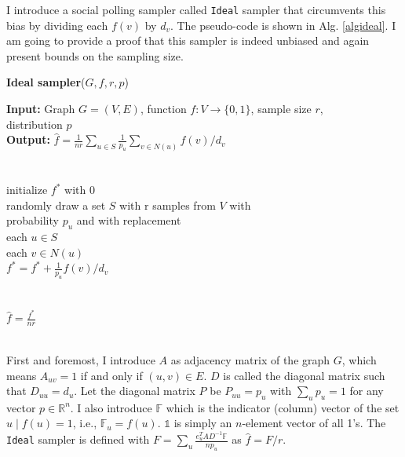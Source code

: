 I introduce a social polling sampler called \texttt{Ideal} sampler that circumvents this bias by dividing each $f(v)$ by $d_v$. The pseudo-code is shown in Alg. \ref{algideal}.
I am going to provide a proof that this sampler is indeed unbiased and again present bounds on the sampling size.
\begin{algorithm*}[!htb]
\caption{\small {\bf Ideal sampler}($G, f, r, p$)}
\begin{code}
{\bf Input:} Graph $G=(V,E)$, function $f : V \rightarrow \{0,1\}$, sample size $r$,\\ distribution $p$ \\
{\bf Output:} $\hat{f}=\frac{1}{nr}\sum\nolimits_{u\in S}\frac{1}{p_u}\sum\nolimits_{v\in N(u)} f(v)/d_v$\\
\\
\uln \>\ubegin\\
\uln \>\>initialize $f^*$ with 0 \\
\uln \>\>randomly draw a set $S$ with r samples from $V$ with\\
\>   \>\>\>probability $p_u$ and with replacement\\
\uln \>\>\ufor each $u \in S$ \udo\\
\uln \>\>\>\ufor each $v \in N(u)$ \udo\\
\uln \>\>\>\>$f^* = f^* + \frac{1}{p_u}f(v)/d_v$ \\
\uln \>\>\>\uend\\
\uln \>\>\uend\\
\uln \>\ureturn $\hat{f} = \frac{f^*}{nr}$ \\
\uln \>\uend\\ 
\end{code}
\label{algideal}
\end{algorithm*}

First and foremost, I introduce $A$ as adjacency matrix of the graph $G$, which means $A_{uv} = 1$ if and only if $(u,v) \in E$. $D$ is called the diagonal matrix such that $D_{uu} = d_u$.
Let the diagonal matrix $P$ be $P_{uu} = p_u$ with $\sum\nolimits_{u}p_u = 1$ for any vector $p \in \mathbb{R}^n$.
I also introduce $\mathds{F}$ which is the indicator (column) vector of the set ${u\;|\;f(u)=1}$, i.e., $\mathds{F}_u=f(u)$.
$\mathds{1}$ is simply an $n$-element vector of all 1's.
The \texttt{Ideal} sampler is defined with $F = \sum_{u}\frac{e_u^TAD^{-1}\mathds{F}}{np_u}$ as $\hat{f} = F/r$.

